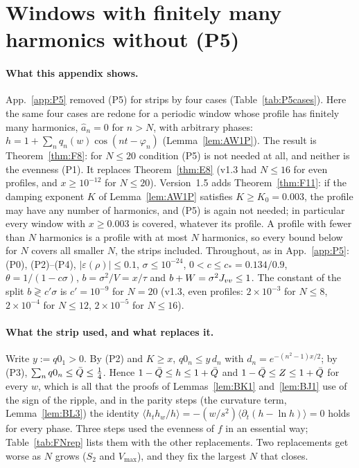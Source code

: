 \section{Windows with finitely many harmonics without (P5)}
\label{app:FN}

\paragraph*{What this appendix shows.}
App.~\ref{app:P5} removed (P5) for strips by four cases (Table~\ref{tab:P5cases}). Here the same four cases are redone for a periodic window whose
profile has finitely many harmonics, $\hat a_n=0$ for $n>N$, with arbitrary phases: $h=1+\sum_nq_n(w)\cos(nt-\varphi_n)$ (Lemma~\ref{lem:AW1P}).
The result is Theorem~\ref{thm:F8}: for $N\le20$ condition (P5) is not needed at all, and neither is the evenness (P1). It replaces Theorem~\ref{thm:E8}
(v1.3 had $N\le16$ for even profiles, and $x\ge10^{-12}$ for $N\le20$). Version~1.5 adds Theorem~\ref{thm:F11}: if the damping exponent $K$ of
Lemma~\ref{lem:AW1P} satisfies $K\ge K_0=0.003$, the profile may have any number of harmonics, and (P5) is again not needed; in particular every window
with $x\ge0.003$ is covered, whatever its profile. A profile with fewer
than $N$ harmonics is a profile with at most $N$ harmonics, so every bound below for $N$ covers all smaller $N$, the strips included. Throughout, as in App.~\ref{app:P5}:
(P0), (P2)--(P4), $|\varepsilon(\rho)|\le0.1$, $\sigma\le10^{-24}$, $0<c\le c_*=0.134/0.9$, $\theta=1/(1-c\sigma)$, $b=\sigma^2/V=x/\tau$ and $b+W=\sigma^2J_{vv}\le1$.
The constant of the split $b\gtrless c'\sigma$ is $c'=10^{-9}$ for $N=20$ (v1.3, even profiles: $2\times10^{-3}$ for $N\le8$, $2\times10^{-4}$ for $N\le12$, $2\times10^{-5}$ for $N\le16$).

\paragraph*{What the strip used, and what replaces it.}
Write $y:=q0_1>0$. By (P2) and $K\ge x$, $q0_n\le y\,d_n$ with $d_n=e^{-(n^2-1)x/2}$; by (P3), $\sum_nq0_n\le\bar Q\le\frac14$. Hence
$1-\bar Q\le h\le1+\bar Q$ and $1-\bar Q\le Z\le1+\bar Q$ for every $w$, which is all that the proofs of Lemmas~\ref{lem:BK1} and~\ref{lem:BJ1} use of the sign of the
ripple, and in the parity steps (the curvature term, Lemma~\ref{lem:BL3}) the identity $\langle h_th_w/h\rangle=-(w/s^2)\langle\partial_t(h-\ln h)\rangle=0$ holds for every
phase. Three steps used the evenness of $f$ in an essential way; Table~\ref{tab:FNrep} lists them with the other replacements. Two replacements get worse as $N$ grows ($S_2$ and $V_{\max}$), and they fix the largest $N$ that closes.

